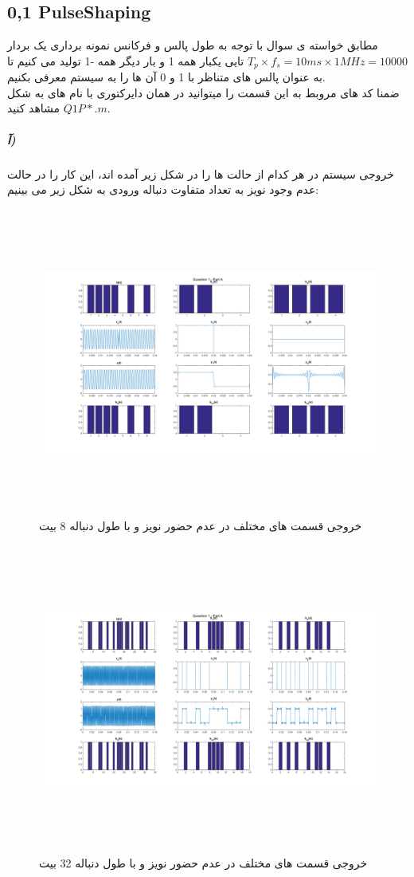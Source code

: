 \documentclass[a4paper,12pt]{article}
\begin{document}
\subsection{0,1 PulseShaping}
مطابق خواسته ی سوال با توجه به طول پالس و فرکانس نمونه برداری یک بردار $T_p \times f_s = 10ms \times 1MHz = 10000 $ تایی یکبار همه 1 و بار دیگر همه -1 تولید می کنیم تا به عنوان پالس های متناظر با 1 و 0 آن ها را به سیستم معرفی بکنیم.
\\
ضمنا کد های مروبط به این قسمت را میتوانید در همان دایرکتوری با نام های به شکل $Q1P*.m$ مشاهد کنید.
\subparagraph{آ)}
خروجی سیستم در هر کدام از حالت ها را در شکل زیر آمده اند، این کار را در حالت عدم وجود نویز به تعداد متفاوت دنباله ورودی به شکل زیر می بینیم:
\begin{figure}[htbp]
\centerline{\includegraphics[width=6.625in, height=4in]{../3.Transferring0and1/Q1PA_8.png}}
\caption{خروجی قسمت های مختلف در عدم حضور نویز و با طول دنباله 8 بیت}
\label{fig}
\end{figure}
\begin{figure}[htbp]
\centerline{\includegraphics[width=6.625in, height=4in]{../3.Transferring0and1/Q1PA_32.png}}
\caption{خروجی قسمت های مختلف در عدم حضور نویز و با طول دنباله 32 بیت}
\label{fig}
\end{figure}
\end{document}
